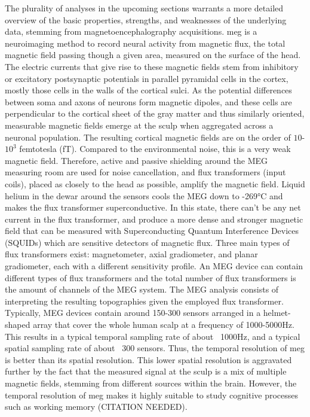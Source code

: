 The plurality of analyses in the upcoming sections warrants a more detailed overview of the basic properties, strengths, and weaknesses of the underlying data, stemming from magnetoencephalography acquisitions.
\gls{meg} is a neuroimaging method to record neural activity from magnetic flux, the total magnetic field passing though a given area, measured on the surface of the head.
The electric currents that give rise to these magnetic fields stem from inhibitory or excitatory postsynaptic potentials in parallel pyramidal cells in the cortex, mostly those cells in the walls of the cortical sulci.
As the potential differences between soma and axons of neurons form magnetic dipoles, and these cells are perpendicular to the cortical sheet of the gray matter and thus similarly oriented, measurable magnetic fields emerge at the sculp when aggregated across a neuronal population.
The resulting cortical magnetic fields are on the order of $10$-$10^{3}$ femtotesla (fT).
Compared to the environmental noise, this is a very weak magnetic field.
Therefore, active and passive shielding around the MEG measuring room are used for noise cancellation, and flux transformers (input coils), placed as closely to the head as possible, amplify the magnetic field.
Liquid helium in the dewar around the sensors cools the MEG down to -269°C and makes the flux transformer superconductive.
In this state, there can’t be any net current in the flux transformer, and produce a more dense and stronger magnetic field that can be measured with Superconducting Quantum Interference Devices (SQUIDs) which are sensitive detectors of magnetic flux.
Three main types of flux transformers exist: magnetometer, axial gradiometer, and planar gradiometer, each with a different sensitivity profile.
An MEG device can contain different types of flux transformers and the total number of flux transformers is the amount of channels of the MEG system.
The MEG analysis consists of interpreting the resulting topographies given the employed flux transformer.
Typically, MEG devices contain around 150-300 sensors arranged in a helmet-shaped array that cover the whole human scalp at a frequency of 1000-5000Hz.
This results in a typical temporal sampling rate of about ~1000Hz, and a typical spatial sampling rate of about ~300 sensors.
Thus, the temporal resolution of \gls{meg} is better than its spatial resolution.
This lower spatial resolution is aggravated further by the fact that the measured signal at the sculp is a mix of multiple magnetic fields, stemming from different sources within the brain.
However, the temporal resolution of \gls{meg} makes it highly suitable to study cognitive processes such as working memory (CITATION NEEDED).




